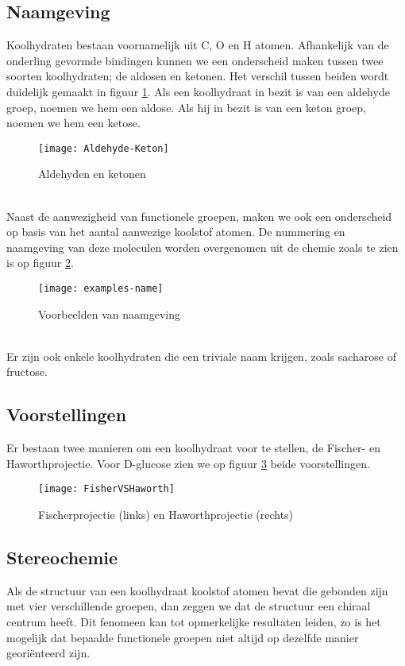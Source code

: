 \documentclass[a4paper,kul]{kulakarticle} %
\begin{document}
\subsection{Naamgeving}
Koolhydraten bestaan voornamelijk uit C, O en H atomen. Afhankelijk van de onderling gevormde bindingen kunnen we een onderscheid maken tussen twee soorten koolhydraten; de aldosen en ketonen. Het verschil tussen beiden wordt duidelijk gemaakt in figuur \ref{fig:aldehyde-keton}. Als een koolhydraat in bezit is van een aldehyde groep, noemen we hem een aldose. Als hij in bezit is van een keton groep, noemen we hem een ketose.
\begin{figure}[htbp]
	\centering
	\texttt{[image: Aldehyde-Keton]}
	\caption[Aldehyden en ketonen]{Aldehyden en ketonen}
	\label{fig:aldehyde-keton}
\end{figure}\\
Naast de aanwezigheid van functionele groepen, maken we ook een onderscheid op basis van het aantal aanwezige koolstof atomen. De nummering en naamgeving van deze moleculen worden overgenomen uit de chemie zoals te zien is op figuur \ref{fig:examples-name}.
\begin{figure}[htbp]
	\centering
	\texttt{[image: examples-name]}
	\caption[Naamgeving]{Voorbeelden van naamgeving}
	\label{fig:examples-name}
\end{figure}\\
Er zijn ook enkele koolhydraten die een triviale naam krijgen, zoals sacharose of fructose.

\subsection{Voorstellingen}
Er bestaan twee manieren om een koolhydraat voor te stellen, de Fischer- en Haworthprojectie. Voor D-glucose zien we op figuur \ref{fig:fishervshaworth} beide voorstellingen.
\begin{figure}[h]
	\centering
	\texttt{[image: FisherVSHaworth]}
	\caption[Fischer- en Haworthprojectie]{Fischerprojectie (links) en Haworthprojectie (rechts)}
	\label{fig:fishervshaworth}
\end{figure}

\subsection{Stereochemie}
Als de structuur van een koolhydraat koolstof atomen bevat die gebonden zijn met vier verschillende groepen, dan zeggen we dat de structuur een chiraal centrum heeft. Dit fenomeen kan tot opmerkelijke resultaten leiden, zo is het mogelijk dat bepaalde functionele groepen niet altijd op dezelfde manier georiënteerd zijn.  
\end{document}
